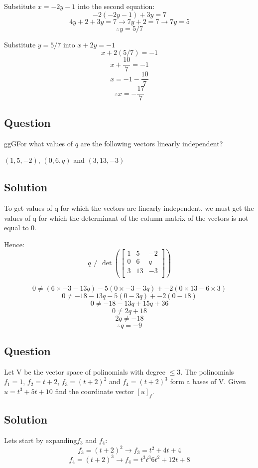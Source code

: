 \documentclass{book}
\begin{document}
Substitute \(x = - 2 y - 1\) into the second equation:
\[- 2 (- 2 y - 1) + 3 y = 7\]
\[4 y + 2 + 3 y = 7 \rightarrow 7 y + 2 = 7 \rightarrow 7 y = 5\]
\[\therefore y = 5/7\]

Substitute \(y = 5/7\) into \(x + 2 y = - 1\)
\[x + 2 (5/7) = - 1\]
\[x + \frac{10}{7} = - 1\]
\[x = - 1 - \frac{10}{7}\]
\[\therefore x = - \frac{17}{7}\]

\subsection{Question}
ggGFor what values of \(q\) are the following vectors linearly independent?

\((1, 5, -2)\), \((0, 6, q)\) and \((3, 13, -3)\)

\subsection*{Solution}
To get values of q for which the vectors are linearly independent, we must get the values of q for which the determinant of the column matrix of the vectors is not equal to 0.

Hence:
\[q \neq \det \left(
\begin{bmatrix}
	1 & 5 & -2 \\
	0 & 6 & q \\
	3 & 13 & -3 \\
\end{bmatrix}
\right)\]

\[0 \neq (6 \times -3 - 13 q) - 5 (0 \times - 3 - 3 q) + {-2}(0 \times 13 - 6 \times 3)\]
\[0 \neq -18 - 13 q - 5 (0 - 3 q) + {-2}(0 - 18)\]
\[0 \neq -18 - 13 q + 15 q + 36\]
\[0 \neq 2 q + 18\]
\[2 q \neq - 18\]
\[\therefore q = - 9\]

\subsection{Question}
Let V be the vector space of polinomials with degree \(\leq 3\). The polinomials \(f_1 = 1\), \(f_2 = t + 2\), \(f_3 = {(t + 2)}^2\) and \(f_4 = {(t + 2)}^3\) form a bases of V. Given \(u = t^3 + 5t + 10\) find the coordinate vector \({[u]}_f\).

\subsection*{Solution}
Lets start by expanding\(f_3\) and \(f_4\):
\[f_3 = {(t + 2)}^2 \rightarrow f_3 = t^2 + 4t + 4\]
\[f_4 = {(t + 2)}^3 \rightarrow f_4 = t^3 t^3 6 t^2 + 12 t + 8\]
\end{document}
